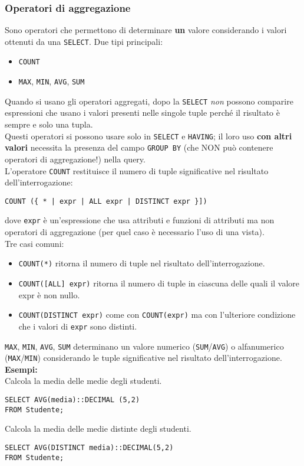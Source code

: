 \documentclass[a4paper, 10pt, titlepage]{article}
\begin{document}
	\subsubsection{Operatori di aggregazione}
		Sono operatori che permettono di determinare \textbf{un} valore considerando i
		valori ottenuti da una \lstinline|SELECT|.
		Due tipi principali:
		\begin{itemize}
			\item \lstinline|COUNT|
			\item \lstinline|MAX|, \lstinline|MIN|, \lstinline|AVG|, \lstinline|SUM|
		\end{itemize}
		Quando si usano gli operatori aggregati, dopo la \lstinline|SELECT| \textit{non} possono
		comparire espressioni che usano i valori presenti nelle singole tuple
		perché il risultato è sempre e solo una tupla. \\
		Questi operatori si possono usare solo in \lstinline|SELECT| e \lstinline|HAVING|; il loro uso \textbf{con altri valori	} necessita la presenza del campo \lstinline|GROUP BY| (che NON può contenere operatori di aggregazione!) nella query. \medskip \\
		L'operatore \lstinline|COUNT| restituisce il numero di tuple significative nel risultato dell’interrogazione:
		\begin{lstlisting}
COUNT ({ * | expr | ALL expr | DISTINCT expr }])
		\end{lstlisting}
		dove \lstinline|expr| è un’espressione che usa attributi e funzioni di attributi ma non
		operatori di aggregazione (per quel caso è necessario l'uso di una vista).\\
		Tre casi comuni:
		\begin{itemize}
			\item \lstinline|COUNT(*)| ritorna il numero di tuple nel risultato dell’interrogazione.
			\item \lstinline|COUNT([ALL] expr)| ritorna il numero di tuple in ciascuna delle quali il valore
			expr è non nullo.
			\item \lstinline|COUNT(DISTINCT expr)| come con \lstinline|COUNT(expr)| ma con l’ulteriore
			condizione che i valori di \lstinline|expr| sono distinti.
		\end{itemize}
		\lstinline|MAX|, \lstinline|MIN|, \lstinline|AVG|, \lstinline|SUM| determinano un valore numerico (\lstinline|SUM|/\lstinline|AVG|) o alfanumerico (\lstinline|MAX|/\lstinline|MIN|)
		considerando le tuple significative nel risultato dell’interrogazione.\medskip \\ 
		\textbf{Esempi: }\\
		Calcola la media delle medie degli studenti.
		\begin{lstlisting}
SELECT AVG(media)::DECIMAL (5,2)
FROM Studente;
		\end{lstlisting}
		Calcola la media delle medie distinte degli studenti.
		\begin{lstlisting}
SELECT AVG(DISTINCT media)::DECIMAL(5,2)
FROM Studente;
		\end{lstlisting}
		
\end{document}

